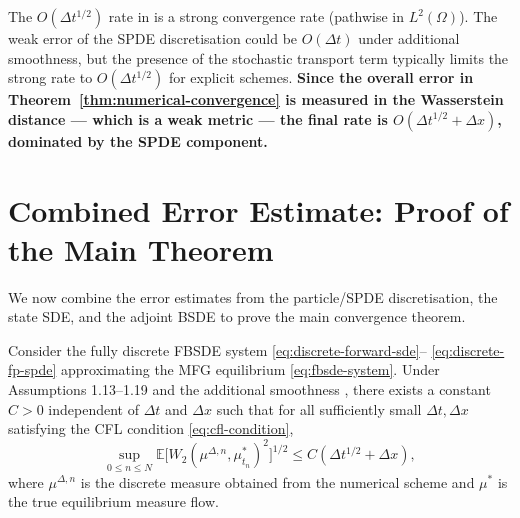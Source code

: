 \begin{remark}
The $O(\Delta t^{1/2})$ rate in  is a strong convergence rate
(pathwise in $L^2(\Omega)$). The weak error of the SPDE discretisation could be
$O(\Delta t)$ under additional smoothness, but the presence of the stochastic
transport term typically limits the strong rate to $O(\Delta t^{1/2})$ for explicit
schemes. \textbf{Since the overall error in
Theorem~\ref{thm:numerical-convergence} is measured in the Wasserstein
distance --- which is a weak metric --- the final rate is $O(\Delta t^{1/2} +
\Delta x)$, dominated by the SPDE component.}
\end{remark}


\section{Combined Error Estimate: Proof of the Main Theorem}
\label{sec:na-combined}

We now combine the error estimates from the particle/SPDE discretisation, the state
SDE, and the adjoint BSDE to prove the main convergence theorem.

\begin{theorem}
\label{thm:numerical-convergence}
Consider the fully discrete FBSDE system \eqref{eq:discrete-forward-sde}--%
\eqref{eq:discrete-fp-spde} approximating the MFG equilibrium \eqref{eq:fbsde-system}.
Under Assumptions 1.13--1.19 and the additional smoothness
, there exists a constant $C > 0$ independent of $\Delta t$
and $\Delta x$ such that for all sufficiently small $\Delta t, \Delta x$ satisfying
the CFL condition \eqref{eq:cfl-condition},
\[
    \sup_{0 \leq n \leq N} \mathbb{E}\big[ W_2(\mu^{\Delta,n}, \mu_{t_n}^*)^2
    \big]^{1/2} \leq C(\Delta t^{1/2} + \Delta x),
\]
where $\mu^{\Delta,n}$ is the discrete measure obtained from the numerical scheme and
$\mu^*$ is the true equilibrium measure flow.
\end{theorem}

